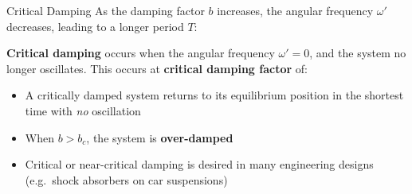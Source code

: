 \documentclass[12pt,compress,aspectratio=169]{beamer}
\begin{document}
\begin{frame}{Critical Damping}
  As the damping factor $b$ increases, the angular frequency $\omega'$
  decreases, leading to a longer period $T$:
  

  \textbf{Critical damping} occurs when the angular frequency $\omega'=0$,
  and the system no longer oscillates. This occurs at
  \textbf{critical damping factor} of:

  \begin{itemize}
  \item\vspace{-.1in}A critically damped system returns to its equilibrium
    position in the shortest time with \emph{no} oscillation
  \item When $b>b_c$, the system is \textbf{over-damped}
  \item Critical or near-critical damping is desired in many engineering designs
    (e.g.\ shock absorbers on car suspensions)
  \end{itemize}
\end{frame}
\end{document}
